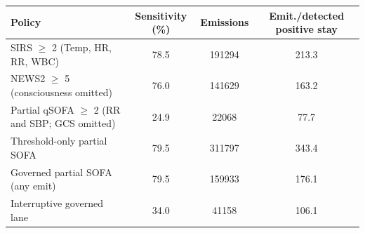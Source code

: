 \begin{tabular}{@{}lccc@{}}
\toprule
Policy & Sensitivity (\%) & Emissions & Emit./detected positive stay \\
\midrule
SIRS $\geq$ 2 (Temp, HR, RR, WBC) & 78.5 & 191294 & 213.3 \\
NEWS2 $\geq$ 5 (consciousness omitted) & 76.0 & 141629 & 163.2 \\
Partial qSOFA $\geq$ 2 (RR and SBP; GCS omitted) & 24.9 & 22068 & 77.7 \\
Threshold-only partial SOFA & 79.5 & 311797 & 343.4 \\
Governed partial SOFA (any emit) & 79.5 & 159933 & 176.1 \\
Interruptive governed lane & 34.0 & 41158 & 106.1 \\
\bottomrule
\end{tabular}
